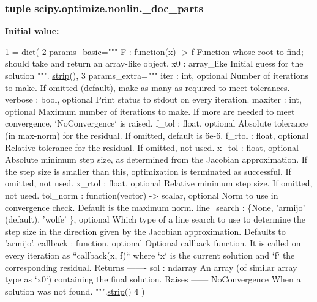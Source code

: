 \subsubsection[{\+\_\+doc\+\_\+parts}]{\setlength{\rightskip}{0pt plus 5cm}tuple scipy.\+optimize.\+nonlin.\+\_\+doc\+\_\+parts}\label{namespacescipy_1_1optimize_1_1nonlin_a28b5c05f917e98b2c130627e965c9ae3}
{\bfseries Initial value\+:}
\begin{DoxyCode}
1 = dict(
2     params\_basic=\textcolor{stringliteral}{"""    F : function(x) -> f        Function whose root to find; should take and return an
       array-like        object.    x0 : array\_like        Initial guess for the solution    """}.
      \hyperlink{domain_8h_a83bfc85d81b39a69a0a2c7d09a36c7ef}{strip}(),
3     params\_extra=\textcolor{stringliteral}{"""    iter : int, optional        Number of iterations to make. If omitted (default),
       make as many        as required to meet tolerances.    verbose : bool, optional        Print status to stdout
       on every iteration.    maxiter : int, optional        Maximum number of iterations to make. If more are
       needed to        meet convergence, `NoConvergence` is raised.    f\_tol : float, optional        Absolute
       tolerance (in max-norm) for the residual.        If omitted, default is 6e-6.    f\_rtol : float, optional       
       Relative tolerance for the residual. If omitted, not used.    x\_tol : float, optional        Absolute minimum
       step size, as determined from the Jacobian        approximation. If the step size is smaller than this,
       optimization        is terminated as successful. If omitted, not used.    x\_rtol : float, optional       
       Relative minimum step size. If omitted, not used.    tol\_norm : function(vector) -> scalar, optional        Norm to
       use in convergence check. Default is the maximum norm.    line\_search : \{None, 'armijo' (default), 'wolfe'
      \}, optional        Which type of a line search to use to determine the step size in the        direction
       given by the Jacobian approximation. Defaults to 'armijo'.    callback : function, optional        Optional
       callback function. It is called on every iteration as        ``callback(x, f)`` where `x` is the current
       solution and `f`        the corresponding residual.    Returns    -------    sol : ndarray        An array (of
       similar array type as `x0`) containing the final solution.    Raises    ------    NoConvergence        When a
       solution was not found.    """}.\hyperlink{domain_8h_a83bfc85d81b39a69a0a2c7d09a36c7ef}{strip}()
4 )
\end{DoxyCode}
\hypertarget{namespacescipy_1_1optimize_1_1nonlin_a8aeda5bbe483199905b66de9ef77c14d}{}
